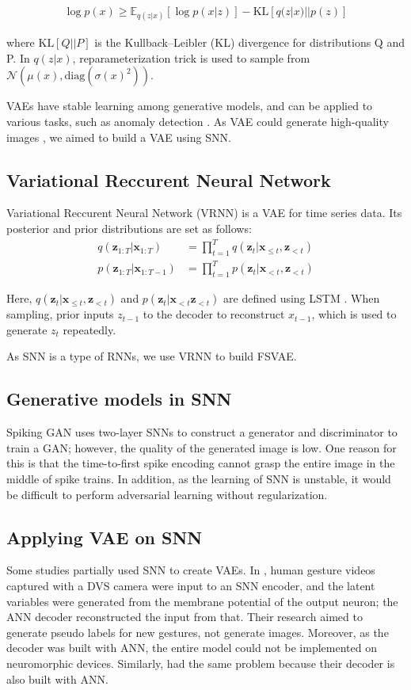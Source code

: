 \documentclass[letterpaper]{article} %
\begin{document}
\begin{align}
    \log p(x) \geq \mathbb{E}_{q(z|x)}[\log p(x|z)] - \mathrm{KL}[q(z|x)||p(z)]
\end{align}

\noindent where $\mathrm{KL}[Q||P]$ is the Kullback--Leibler (KL) divergence for distributions Q and P. In $q(z|x)$, reparameterization trick is used to sample from $\mathcal{N}(\mu(x),\mathrm{diag}(\sigma(x)^2))$.

VAEs have stable learning among generative models, and can be applied to various tasks, such as anomaly detection \cite{vaeano}. As VAE could generate high-quality images \cite{vqvae2, nvae}, we aimed to build a VAE using SNN.

\subsection{Variational Reccurent Neural Network}
Variational Reccurent Neural Network (VRNN) \cite{vrnn} is a VAE for time series data. Its posterior and prior distributions are set as follows:
\begin{align}
    q(\bm{z}_{1:T} | \bm{x}_{1:T}) &= \prod_{t=1}^T q(\bm{z}_t | \bm{x}_{\leq t}, \bm{z}_{<t}) \\
    p(\bm{z}_{1:T} | \bm{x}_{1:T-1}) &= \prod_{t=1}^T p(\bm{z}_t | \bm{x}_{<t}, \bm{z}_{<t})
\end{align}

Here, $q(\bm{z}_t|\bm{x}_{\leq t},\bm{z}_{<t})$ and $p(\bm{z}_t|\bm{x}_{<t}\bm{z}_{<t})$ are defined using LSTM \cite{lstm}. When sampling, prior inputs $z_{t-1}$ to the decoder to reconstruct $x_{t-1}$, which is used to generate $z_t$ repeatedly.

As SNN is a type of RNNs, we use VRNN to build FSVAE.

\subsection{Generative models in SNN}
Spiking GAN \cite{spikinggan} uses two-layer SNNs to construct a generator and discriminator to train a GAN; however, the quality of the generated image is low. One reason for this is that the time-to-first spike encoding cannot grasp the entire image in the middle of spike trains. In addition, as the learning of SNN is unstable, it would be difficult to perform adversarial learning without regularization.


\subsection{Applying VAE on SNN}
Some studies partially used SNN to create VAEs. In \cite{stewart2021gesture}, human gesture videos captured with a DVS camera were input to an SNN encoder, and the latent variables were generated from the membrane potential of the output neuron; the ANN decoder reconstructed the input from that. Their research aimed to generate pseudo labels for new gestures, not generate images. Moreover, as the decoder was built with ANN, the entire model could not be implemented on neuromorphic devices. Similarly, \cite{dib} had the same problem because their decoder is also built with ANN.
\end{document}
